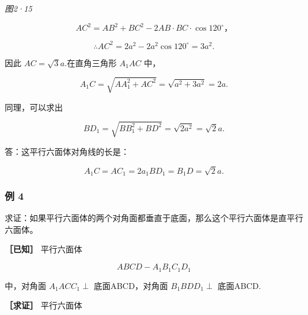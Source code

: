 \emph{图2·15}

\[
A C ^ {2} = A B ^ {2} + B C ^ {2} - 2 A B \cdot B C \cdot \cos 120 ^ {\circ}\text{，}
\]

\[
\therefore A C ^ {2} = 2 a ^ {2} - 2 a ^ {2} \cos 120 ^ {\circ} = 3 a ^ {2}.
\]

因此 \(AC = \sqrt{3} a.\)在直角三角形 \(A_{1}AC\) 中，

\[
A _ {1} C = \sqrt {A A _ {1} ^ {2} + A C ^ {2}} = \sqrt {a ^ {2} + 3 a ^ {2}} = 2 a.
\]

同理，可以求出

\[
B D _ {1} = \sqrt {B B _ {1} ^ {2} + B D ^ {2}} = \sqrt {2 a ^ {2}} = \sqrt {2} a.
\]

答：这平行六面体对角线的长是：

\[
A _ {1} C = A C _ {1} = 2 a _ {1} B D _ {1} = B _ {1} D = \sqrt {2} a.
\]

\subsubsection{例 4}

求证：如果平行六面体的两个对角面都垂直于底面，那么这个平行六面体是直平行六面体。

\textbf{［已知］} 平行六面体

\[
A B C D - A _ {1} B _ {1} C _ {1} D _ {1}
\]

中，对角面 \(A_{1}ACC_{1}\perp\) 底面ABCD，对角面 \(B_{1}BDD_{1}\perp\)
底面ABCD.

\textbf{［求证］} 平行六面体

